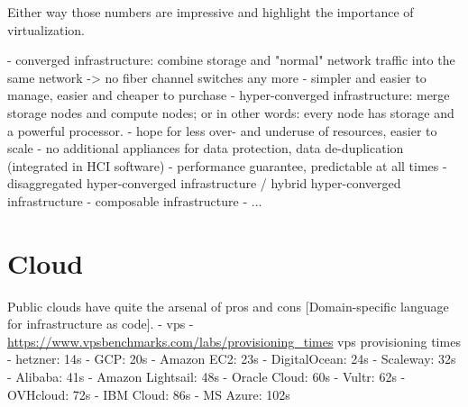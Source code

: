Either way those numbers are impressive and highlight the importance of virtualization.


%


- converged infrastructure: combine storage and "normal" network traffic into the same network -> no fiber channel switches any more
  - simpler and easier to manage, easier and cheaper to purchase
- hyper-converged infrastructure: merge storage nodes and compute nodes; or in other words: every node has storage and a powerful processor.
  - hope for less over- and underuse of resources, easier to scale
  - no additional appliances for data protection, data de-duplication (integrated in HCI software)
  - performance guarantee, predictable at all times
- disaggregated hyper-converged infrastructure / hybrid hyper-converged infrastructure
- composable infrastructure
- ...




\section{Cloud}
  Public clouds have quite the arsenal of pros and cons [Domain-specific language for infrastructure as code].
  - vps
  - \url{https://www.vpsbenchmarks.com/labs/provisioning_times}
    vps provisioning times
    - hetzner: 14s
    - GCP: 20s
    - Amazon EC2: 23s
    - DigitalOcean: 24s
    - Scaleway: 32s
    - Alibaba: 41s
    - Amazon Lightsail: 48s
    - Oracle Cloud: 60s
    - Vultr: 62s
    - OVHcloud: 72s
    - IBM Cloud: 86s
    - MS Azure: 102s

